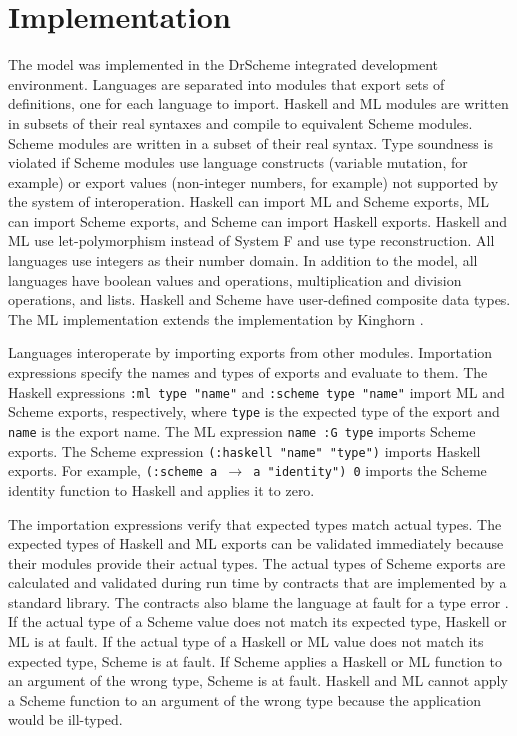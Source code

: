 \chapter{Implementation}

The model was implemented in the DrScheme integrated development environment.  Languages are separated into modules that export sets of definitions, one for each language to import.  Haskell and ML modules are written in subsets of their real syntaxes and compile to equivalent Scheme modules.  Scheme modules are written in a subset of their real syntax.  Type soundness is violated if Scheme modules use language constructs (variable mutation, for example) or export values (non-integer numbers, for example) not supported by the system of interoperation.  Haskell can import ML and Scheme exports, ML can import Scheme exports, and Scheme can import Haskell exports.  Haskell and ML use let-polymorphism instead of System F and use type reconstruction.  All languages use integers as their number domain.  In addition to the model, all languages have boolean values and operations, multiplication and division operations, and lists.  Haskell and Scheme have user-defined composite data types.  The ML implementation extends the implementation by Kinghorn \cite{kinghorn07}.

Languages interoperate by importing exports from other modules.  Importation expressions specify the names and types of exports and evaluate to them.  The Haskell expressions \texttt{:ml type "name"} and \texttt{:scheme type "name"} import ML and Scheme exports, respectively, where \texttt{type} is the expected type of the export and \texttt{name} is the export name.  The ML expression \texttt{name :G type} imports Scheme exports.  The Scheme expression \texttt{(:haskell "name" "type")} imports Haskell exports.  For example, \texttt{(:scheme a $\rightarrow$ a "identity") 0} imports the Scheme identity function to Haskell and applies it to zero.

The importation expressions verify that expected types match actual types.  The expected types of Haskell and ML exports can be validated immediately because their modules provide their actual types.  The actual types of Scheme exports are calculated and validated during run time by contracts \cite{findler02} that are implemented by a standard library.  The contracts also blame the language at fault for a type error \cite{findler02}.  If the actual type of a Scheme value does not match its expected type, Haskell or ML is at fault.  If the actual type of a Haskell or ML value does not match its expected type, Scheme is at fault.  If Scheme applies a Haskell or ML function to an argument of the wrong type, Scheme is at fault.  Haskell and ML cannot apply a Scheme function to an argument of the wrong type because the application would be ill-typed.